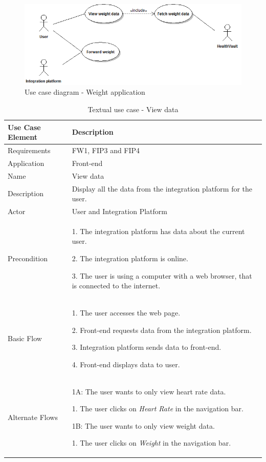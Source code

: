 \begin{figure}
\begin{center}
\includegraphics[scale=0.6]{../Figures/use-case-diagram-weight.png}
\end{center}
\caption{Use case diagram - Weight application}
\label{figure:use-case-diagram-weight}
\end{figure}

\begin{table}[h]
\begin{center}
\begin{tabular}{ l | p{10cm} }
  \hline
  \textbf{Use Case Element} & \textbf{Description} \\ \hline\hline
  Requirements & FW1, FIP3 and FIP4\\ \hline
  Application & Front-end \\ \hline
  Name & View data \\ \hline
  Description & Display all the data from the integration platform for the user. \\ \hline
  Actor & User and Integration Platform \\ \hline
  Precondition &
	\par 1. The integration platform has data about the current user.
	\par 2. The integration platform is online.
	\par 3. The user is using a computer with a web browser, that is connected to the internet.
	\\ \hline
  Basic Flow & 
  	\par 1. The user accesses the web page.
  	\par 2. Front-end requests data from the integration platform.
  	\par 3. Integration platform sends data to front-end.
  	\par 4. Front-end displays data to user.
  	\\ \hline
  Alternate Flows & 
  	\par 1A: The user wants to only view heart rate data.
  	\par\hspace{15pt} 1. The user clicks on \textit{Heart Rate} in the navigation bar.
  	\par 1B: The user wants to only view weight data.
  	\par\hspace{15pt} 1. The user clicks on \textit{Weight} in the navigation bar.
  \\ \hline
\end{tabular}
\end{center}
\caption{Textual use case - View data}
\label{table:use-case-view-data}
\end{table}

